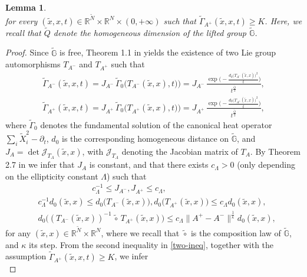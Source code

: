 \documentclass[11pt,a4paper]{article}
\newtheorem{lemma}[theorem]{\bf Lemma}
\numberwithin{equation}{section}
\def \rn {{\mathbb {R}}^{N}}
\def \rnm {{\mathbb {R}}^{\tilde N}}
\def \tt {\tilde}
\def \GG {{\mathbb{G}}}
\def \p {\partial}
\def \ti {\times}
\def \G {{\Gamma}}
\begin{document}
{{\begin{lemma}
\begin{equation}
	\end{equation}
	for every $(\tilde x,x,t) \in \rnm\times \rn \times (0,+\infty)$ such that $\tt\G_{A^{+}} (\tilde x,x,t)\geq K$. Here, we recall that $\tt Q$ denote the homogeneous dimension of the lifted group $\tt \GG$. 
\end{lemma}
\begin{proof}
	Since $\tt\GG$ is free, Theorem 1.1 in \cite{bonfiglioli2004families} yields the existence of two Lie group automorphisms $T_{A^{-}}$ and $T_{A^{+}}$ such that 
	\begin{equation}\label{diffeormophic-sublapalcians}
		\begin{aligned}
			\tt\G_{A^{-}}(\tilde x,x,t)= J_{A^-}\,\tt\G_0\big(T_{A^-}(\tt x,x),t)\big) = J_{A^-}\,\frac{\exp\Bigg(-\frac{ d_0 \big(T_{A^-}(\tt x,x)\big)^2}{t}\Bigg)}{t^{\frac{\tilde{Q}}{2}}},\\
			\tt\G_{A^{+}}(\tilde x,x,t)= J_{A^+}\,\tt\G_0\big(T_{A^+}(\tt x,x),t)\big) = J_{A^+}\, \frac{\exp\Bigg(-\frac{ d_0 \big(T_{A^+}(\tt x,x)\big)^2}{t}\Bigg)}{t^{\frac{\tilde{Q}}{2}}},
		\end{aligned}
	\end{equation} 
	where $\tt\G_0$ denotes the fundamental solution of the canonical heat operator $\sum_i\tt X_i^2 -\p_t$, $d_0$ is the corresponding homogeneous distance on $\tt\GG$, and $J_A = \det \mathcal{J}_{T_{A}}(\tt x,x)$, with $\mathcal{J}_{T_A}$ denoting the Jacobian matrix of $T_A$.  By Theorem 2.7 in \cite{bonfiglioli2004families} we infer that $J_A$ is constant, and that there exists $c_\Lambda>0$ (only depending on the ellipticity constant $\Lambda$) such that 
	\begin{equation}\label{two-ineq}
		\begin{aligned}
			&\qquad \qquad \qquad\;\; c_\Lambda^{-1} \leq J_{A^-}, J_{A^+} \leq c_\Lambda, \\
			&c_\Lambda^{-1}  d_0(\tt x,x) \leq d_0\big(T_{A^-}(\tt x,x)\big),d_0\big(T_{A^+}(\tt x,x)\big) \leq c_\Lambda d_0(\tt x,x), \\
			& d_0\big((T_{A^-}(\tt x,x))^{-1} \,\tt\circ\, T_{A^+}(\tt x,x)\big) \leq c_\Lambda \|A^+ - A^-\|^{\frac{1}{\kappa}} d_0(\tt x,x),
		\end{aligned}
	\end{equation}
	for any $(\tt x,x)\in\rnm\ti\rn$, where we recall that $\tt \circ$ is the composition law of $\tt \GG$, and $\kappa$ its step. From the second inequality in \eqref{two-ineq}, together with the assumption $\tt\G_{A^{+}} (\tilde x,x,t)\geq K$, we infer
	\begin{equation}\label{K-implies}

\end{equation}
\end{proof}}}
\end{document}
